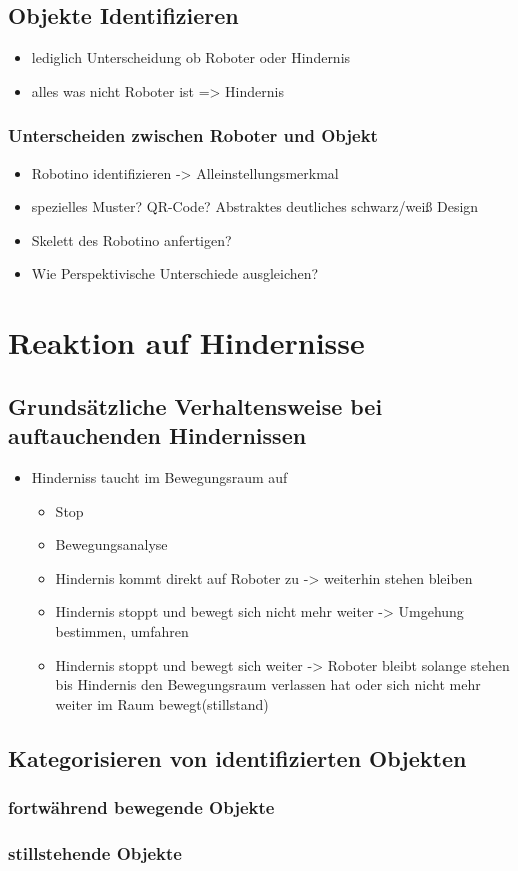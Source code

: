 		\section{Objekte Identifizieren}
		\begin{itemize}
		\item lediglich Unterscheidung ob Roboter oder Hindernis
		\item alles was nicht Roboter ist => Hindernis
		\end{itemize}
			\subsection{Unterscheiden zwischen Roboter und Objekt}
			\begin{itemize}
			\item Robotino identifizieren -> Alleinstellungsmerkmal
			\item spezielles Muster? QR-Code? Abstraktes deutliches schwarz/weiß Design
			\item Skelett des Robotino anfertigen?
			\item Wie Perspektivische Unterschiede ausgleichen?
			\end{itemize}
		
	\chapter{Reaktion auf Hindernisse}
		\section{Grundsätzliche Verhaltensweise bei auftauchenden Hindernissen}
		\begin{itemize}
		\item Hinderniss taucht im Bewegungsraum auf
			\begin{itemize}
				\item Stop
				\item Bewegungsanalyse
				\item Hindernis kommt direkt auf Roboter zu -> weiterhin stehen bleiben
				\item Hindernis stoppt und bewegt sich nicht mehr weiter -> Umgehung bestimmen, umfahren
				\item Hindernis stoppt und bewegt sich weiter -> Roboter bleibt solange stehen bis Hindernis den Bewegungsraum verlassen hat oder sich nicht mehr weiter im Raum bewegt(stillstand) 
			\end{itemize}
		\end{itemize}
		\section{Kategorisieren von identifizierten Objekten}
			\subsection{fortwährend bewegende Objekte}
			\subsection{stillstehende Objekte}